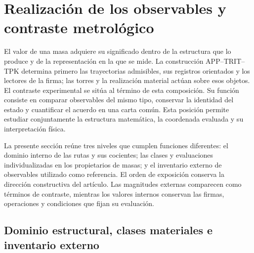 
\section{Realización de los observables y contraste metrológico}
\label{sec:vi-contraste-metrologico}

El valor de una masa adquiere su significado dentro de la estructura que lo
produce y de la representación en la que se mide. La construcción
APP--TRIT--TPK determina primero las trayectorias admisibles, sus registros
orientados y los lectores de la firma; las torres y la realización material
actúan sobre esos objetos. El contraste experimental se sitúa al término de
esta composición. Su función consiste en comparar observables del mismo
tipo, conservar la identidad del estado y cuantificar el acuerdo en una
carta común. Esta posición permite estudiar conjuntamente la estructura
matemática, la coordenada evaluada y su interpretación física.

La presente sección reúne tres niveles que cumplen funciones diferentes:
el dominio interno de las rutas y sus cocientes; las clases y evaluaciones
individualizadas en los propietarios de masas; y el inventario externo de
observables utilizado como referencia. El orden de exposición conserva la
dirección constructiva del artículo. Las magnitudes externas comparecen como
términos de contraste, mientras los valores internos conservan las firmas,
operaciones y condiciones que fijan su evaluación.

\subsection{Dominio estructural, clases materiales e inventario externo}
\label{subsec:vi-dominios-contraste}

